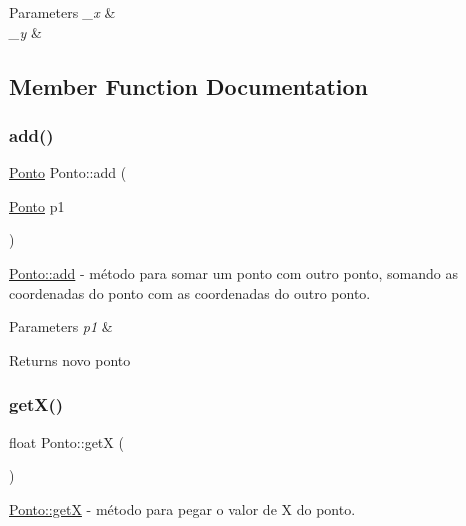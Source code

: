 \begin{DoxyParams}{Parameters}
{\em \+\_\+x} & \\
\hline
{\em \+\_\+y} & \\
\hline
\end{DoxyParams}


\subsection{Member Function Documentation}
\mbox{\label{classPonto_af05e1eac2bd0c30fc4ec909b8500f762}} 
\subsubsection{\texorpdfstring{add()}{add()}}
{\footnotesize\ttfamily \hyperlink{classPonto}{Ponto} Ponto\+::add (\begin{DoxyParamCaption}\item[{\hyperlink{classPonto}{Ponto}}]{p1 }\end{DoxyParamCaption})}



\hyperlink{classPonto_af05e1eac2bd0c30fc4ec909b8500f762}{Ponto\+::add} -\/ método para \textquotesingle{}somar\textquotesingle{} um ponto com outro ponto, somando as coordenadas do ponto com as coordenadas do outro ponto. 


\begin{DoxyParams}{Parameters}
{\em p1} & \\
\hline
\end{DoxyParams}
\begin{DoxyReturn}{Returns}
novo ponto 
\end{DoxyReturn}
\mbox{\label{classPonto_ae4823d6ee26ff3448ee403d26a3c6d2f}} 
\subsubsection{\texorpdfstring{get\+X()}{getX()}}
{\footnotesize\ttfamily float Ponto\+::getX (\begin{DoxyParamCaption}{ }\end{DoxyParamCaption})}



\hyperlink{classPonto_ae4823d6ee26ff3448ee403d26a3c6d2f}{Ponto\+::getX} -\/ método para pegar o valor de X do ponto. 

